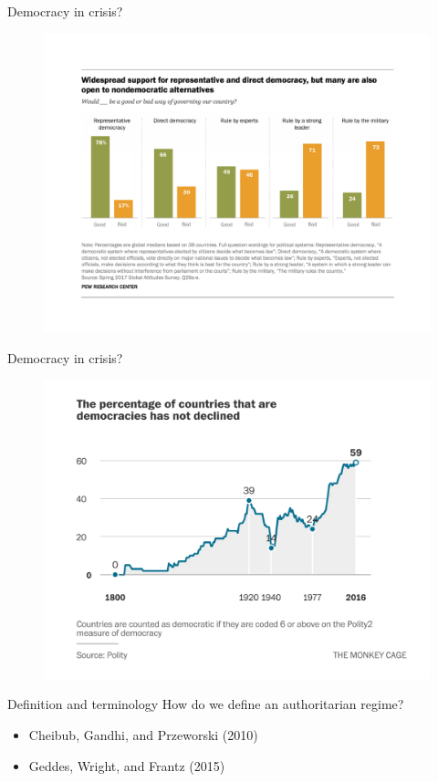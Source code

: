\documentclass[10pt]{beamer}
\begin{document}
\begin{frame}{Democracy in crisis?}
	\begin{figure}
	\centering
	\includegraphics[scale=0.42]{Figs/pew}
	\end{figure}
\end{frame}

\begin{frame}{Democracy in crisis?}
	\begin{figure}
	\centering
	\includegraphics[scale=0.38]{Figs/dan}
	\end{figure}
\end{frame}

\begin{frame}{Definition and terminology}
How do we define an authoritarian regime?
	\pause
	\vspace{0.1cm}
	\begin{itemize}
		\item Cheibub, Gandhi, and Przeworski (2010)
		\item Geddes, Wright, and Frantz (2015)
	\end{itemize}
\end{frame}
\end{document}
